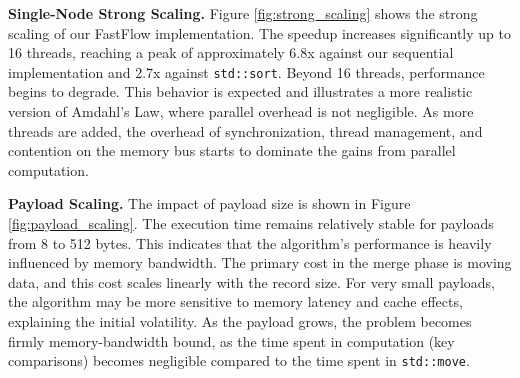 \documentclass[10pt]{article}
\newcommand{\code}[1]{\texttt{#1}}
\begin{document}
\textbf{Single-Node Strong Scaling.} Figure \ref{fig:strong_scaling} shows the strong scaling of our FastFlow implementation. The speedup increases significantly up to 16 threads, reaching a peak of approximately 6.8x against our sequential implementation and 2.7x against \code{std::sort}. Beyond 16 threads, performance begins to degrade. This behavior is expected and illustrates a more realistic version of Amdahl's Law, where parallel overhead is not negligible. As more threads are added, the overhead of synchronization, thread management, and contention on the memory bus starts to dominate the gains from parallel computation.

\textbf{Payload Scaling.} The impact of payload size is shown in Figure \ref{fig:payload_scaling}. The execution time remains relatively stable for payloads from 8 to 512 bytes. This indicates that the algorithm's performance is heavily influenced by memory bandwidth. The primary cost in the merge phase is moving data, and this cost scales linearly with the record size. For very small payloads, the algorithm may be more sensitive to memory latency and cache effects, explaining the initial volatility. As the payload grows, the problem becomes firmly memory-bandwidth bound, as the time spent in computation (key comparisons) becomes negligible compared to the time spent in \code{std::move}.
\end{document}
